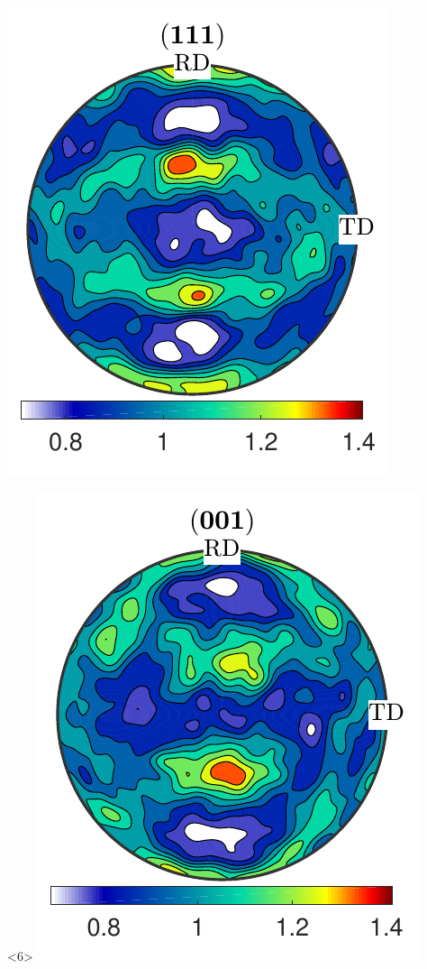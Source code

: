 \documentclass[compress]{beamer}
\begin{document}
\begin{frame}[fragile]
\begin{columns}
\begin{column}{0.29\textwidth}
\begin{onlyenv}
      \includegraphics[width=\textwidth]{pic/rolling111_2}
    \end{onlyenv}

        \begin{onlyenv}<6>
        \includegraphics[width=\textwidth]{pic/rolling001_3}


\end{onlyenv}
\end{column}
\end{columns}
\end{frame}
\end{document}
